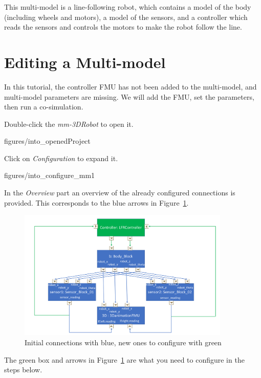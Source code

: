 \documentclass[11pt,a4paper]{../tutorial}
\begin{document}
This multi-model is a line-following robot, which contains a model of the body (including wheels and motors), a model of the sensors, and a controller which reads the sensors and controls the motors to make the robot follow the line.

\section{Editing a Multi-model}

In this tutorial, the controller FMU has not been added to the multi-model, and multi-model parameters are missing. We will add the FMU, set the parameters, then run a co-simulation.

\begin{instructions}
\item Double-click the \emph{mm-3DRobot} to open it.

    \begin{annotation}[width=0.53\linewidth,trim=0 0 250 200,clip]{figures/into_openedProject}
    \end{annotation}

\newpage
\item Click on \emph{Configuration} to expand it.

    \begin{annotation}[width=0.8\linewidth]{figures/into_configure_mm1}
    \end{annotation}

In the \emph{Overview} part an overview of the already configured connections is provided. This corresponds to the blue arrows in Figure~\ref{fig:initialconfig}.

\begin{figure}[!htb]
  \vspace{-0.2cm}
  \centering
  \includegraphics[width=0.9\textwidth,trim={6mm 5mm 6mm 5mm},clip]{figures/InitialConfigurations}
  \caption{Initial connections with blue, new ones to configure with green}
  \label{fig:initialconfig}
\end{figure}
The green box and arrows in Figure~\ref{fig:initialconfig} are what you need to configure in the steps below.


\end{instructions}
\end{document}
